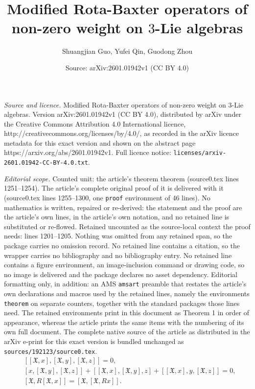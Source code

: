 \documentclass[10pt,a4paper]{amsart}
\title{Modified Rota-Baxter operators of non-zero weight on $3$-Lie algebras}
\author{Shuangjian Guo, Yufei Qin, Guodong Zhou}
\date{Source: arXiv:2601.01942v1 (CC BY 4.0)}
\begin{document}
\maketitle

\noindent\emph{Source and licence.} Modified Rota-Baxter operators of non-zero weight on $3$-Lie algebras. Version arXiv:2601.01942v1 (CC BY 4.0), distributed by arXiv under the Creative Commons Attribution 4.0 International licence, http://creativecommons.org/licenses/by/4.0/, as recorded in the arXiv licence metadata for this exact version and shown on the abstract page https://arxiv.org/abs/2601.01942v1. Full licence notice: \texttt{licenses/arxiv-2601.01942-CC-BY-4.0.txt}.\par\smallskip

\noindent\textit{Editorial scope.} Counted unit: the article's theorem theorem (source0.tex lines 1251--1254). The article's complete original proof of it is delivered with it (source0.tex lines 1255--1300, one \texttt{proof} environment of 46 lines). No mathematics is written, repaired or re-derived: the statement and the proof are the article's own lines, in the article's own notation, and no retained line is substituted or re-flowed.  Retained uncounted as the source-local context the proof needs: lines 1201--1205.  Nothing was omitted from any retained span, so the package carries no omission record.  No retained line contains a citation, so the wrapper carries no bibliography and no bibliography entry.  No retained line contains a figure environment, an image-inclusion command or drawing code, so no image is delivered and the package declares no asset dependency.  Editorial formatting only, in addition: an AMS \texttt{amsart} preamble that restates the article's own declarations and macros used by the retained lines, namely the environments \texttt{theorem} on separate counters, together with the standard packages those lines need.  The retained environments print in this document as Theorem 1 in order of appearance, whereas the article prints the same items with the numbering of its own full document.  The complete native source of the article as distributed in the arXiv e-print for this exact version is bundled unchanged as \texttt{sources/192123/source0.tex}.
 \begin{align}
& [[\mathfrak{X}, x],[\mathfrak{X}, y],[\mathfrak{X}, z]]=0,\label{6.5}\\
& [x, [\mathfrak{X}, y],[\mathfrak{X}, z]]+[[\mathfrak{X}, x], [\mathfrak{X}, y], z]+[[\mathfrak{X}, x],y,[\mathfrak{X}, z]]=0,\label{6.6}\\
& [\mathfrak{X}, R[\mathfrak{X}, x]] =[\mathfrak{X}, [\mathfrak{X}, Rx]].\label{6.7}
\end{align}
\end{document}
